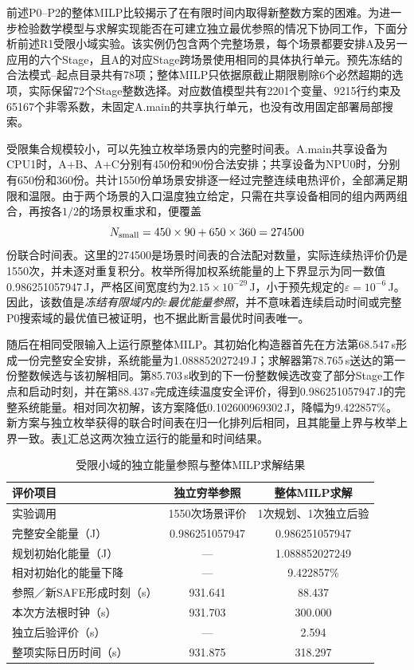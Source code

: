 前述P0--P2的整体MILP比较揭示了在有限时间内取得新整数方案的困难。为进一步检验数学模型与求解实现能否在可建立独立最优参照的情况下协同工作，下面分析前述R1受限小域实验。该实例仍包含两个完整场景，每个场景都要安排A及另一应用的六个Stage，且A的对应Stage跨场景使用相同的具体执行单元。预先冻结的合法模式--起点目录共有78项；整体MILP只依据原截止期限剔除6个必然超期的选项，实际保留72个Stage整数选择。对应数值模型共有2201个变量、9215行约束及65167个非零系数，未固定A.main的共享执行单元，也没有改用固定部署局部搜索。

受限集合规模较小，可以先独立枚举场景内的完整时间表。A.main共享设备为CPU1时，A+B、A+C分别有450份和90份合法安排；共享设备为NPU0时，分别有650份和360份。共计1550份单场景安排逐一经过完整连续电热评价，全部满足期限和温限。由于两个场景的入口温度独立给定，只需在共享设备相同的组内两两组合，再按各$1/2$的场景权重求和，便覆盖
\begin{equation}
 N_{\rm small}=450\times90+650\times360=274500
 \label{eq:exp-small-count}
\end{equation}
份联合时间表。这里的274500是场景时间表的合法配对数量，实际连续热评价仍是1550次，并未逐对重复积分。枚举所得加权系统能量的上下界显示为同一数值0.986251057947\,J，严格区间宽度约为$2.15\times10^{-29}$\,J，小于预先规定的$\varepsilon=10^{-6}$\,J。因此，该数值是\emph{冻结有限域内的$\varepsilon$最优能量参照}，并不意味着连续启动时间或完整P0搜索域的最优值已被证明，也不据此断言最优时间表唯一。

随后在相同受限输入上运行原整体MILP。其初始化构造器首先在方法第68.547\,s形成一份完整安全安排，系统能量为1.088852027249\,J；求解器第78.765\,s送达的第一份整数候选与该初解相同。第85.703\,s收到的下一份整数候选改变了部分Stage工作点和启动时刻，并在第88.437\,s完成连续温度安全评价，得到0.986251057947\,J的完整系统能量。相对同次初解，该方案降低0.102600969302\,J，降幅为9.422857\%。新方案与独立枚举获得的联合时间表在归一化排列后相同，且其能量上界与枚举上界一致。表\ref{tab:exp-small-quality}汇总这两次独立运行的能量和时间结果。

\begin{table}[htbp]
\centering
\small
\caption{受限小域的独立能量参照与整体MILP求解结果}
\label{tab:exp-small-quality}
\begin{tabular}{lcc}
\toprule
评价项目 & 独立穷举参照 & 整体MILP求解 \\
\midrule
实验调用 & 1550次场景评价 & 1次规划、1次独立后验 \\
完整安全能量（J） & 0.986251057947 & 0.986251057947 \\
规划初始化能量（J） & --- & 1.088852027249 \\
相对初始化的能量下降 & --- & 9.422857\% \\
参照／新SAFE形成时刻（s） & 931.641 & 88.437 \\
本次方法根时钟（s） & 931.703 & 300.000 \\
独立后验评价（s） & --- & 2.594 \\
整项实际日历时间（s） & 931.875 & 318.297 \\
\bottomrule
\end{tabular}
\end{table}

